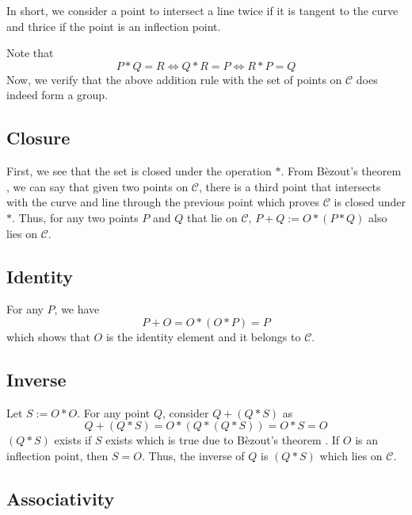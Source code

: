 In short, we consider a point to intersect a line twice if it is tangent to the curve and thrice if the point is an inflection point. 

\noindent
Note that
\[P*Q=R \iff Q*R=P \iff R*P=Q\]
Now, we verify that the above addition rule with the set of points on $\mathcal{C}$ does indeed form a group.

\subsection*{Closure}
First, we see that the set is closed under the operation $*$.
From B\`ezout's theorem \cite[Thm.~A.1]{silver}, we can say that given two points on $\mathcal{C}$, there is a third point that intersects with the curve and line through the previous point which proves $\mathcal{C}$ is closed under $*$.
Thus, for any two points $P$ and $Q$ that lie on $\mathcal{C}$, $P+Q := O*(P*Q)$ also lies on $\mathcal{C}$.

\subsection*{Identity}
For any $P$, we have
\[P+O = O*(O*P) = P\]
which shows that $O$ is the identity element and it belongs to $\mathcal{C}$.

\subsection*{Inverse}
Let $S:=O*O$. For any point $Q$, consider $Q+(Q*S)$ as
\[Q+(Q*S) = O*(Q*(Q*S)) = O*S = O\]
$(Q*S)$ exists if $S$ exists which is true due to B\`ezout's theorem \cite[Thm.~A.1]{silver}.
If $O$ is an inflection point, then $S = O$.
Thus, the inverse of $Q$ is $(Q*S)$ which lies on $\mathcal{C}$.

\subsection*{Associativity}

